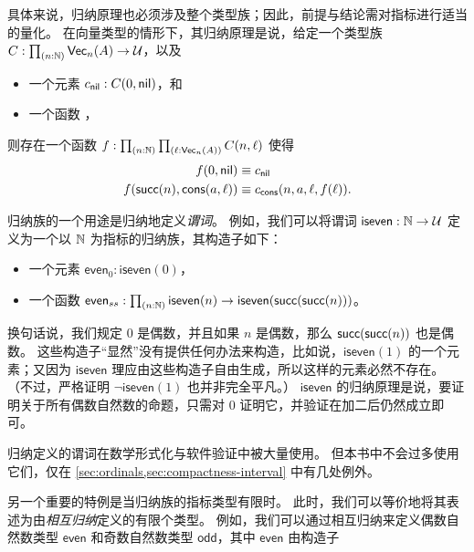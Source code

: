 具体来说，归纳原理也必须涉及整个类型族；因此，前提与结论需对指标进行适当的量化。
在向量类型的情形下，其归纳原理是说，给定一个类型族 $C:\prd{n:\nat} \vect n A \to \type$，以及

\begin{itemize}
\item 一个元素 $c_{\mathsf{nil}} : C(0,\mathsf{nil})$，和
\item 一个函数 ，
\end{itemize}

则存在一个函数 $f:\prd{n:\nat}{\ell:\vect n A} C(n,\ell)$ 使得
\begin{align*}
  f(0,\mathsf{nil}) &\equiv c_{\mathsf{nil}}\\
  f(\mathsf{succ}(n),\mathsf{cons}(a,\ell)) &\equiv c_{\mathsf{cons}}(n,a,\ell,f(\ell)).
\end{align*}

%
%
归纳族的一个用途是归纳地定义\emph{谓词}。
例如，我们可以将谓词 $\mathsf{iseven}:\mathbb{N}\to\mathcal{U}$ 定义为一个以 $\mathbb{N}$ 为指标的归纳族，其构造子如下：

\begin{itemize}
\item 一个元素 $\mathsf{even}_0 : \mathsf{iseven}(0)$，
\item 一个函数 $\mathsf{even}_{ss} : \prd{n:\nat} \mathsf{iseven}(n) \to \mathsf{iseven}(\suc(\suc(n)))$。
\end{itemize}

换句话说，我们规定 $0$ 是偶数，并且如果 $n$ 是偶数，那么 $\mathsf{succ}(\mathsf{succ}(n))$ 也是偶数。
这些构造子``显然''没有提供任何办法来构造，比如说，$\mathsf{iseven}(1)$ 的一个元素；又因为 $\mathsf{iseven}$ 理应由这些构造子自由生成，所以这样的元素必然不存在。
（不过，严格证明 $\neg \mathsf{iseven}(1)$ 也并非完全平凡。）
$\mathsf{iseven}$ 的归纳原理是说，要证明关于所有偶数自然数的命题，只需对 $0$ 证明它，并验证在加二后仍然成立即可。

%
归纳定义的谓词在数学形式化与软件验证中被大量使用。
但本书中不会过多使用它们，仅在 \cref{sec:ordinals,sec:compactness-interval} 中有几处例外。

%
%
另一个重要的特例是当归纳族的指标类型有限时。
此时，我们可以等价地将其表述为由\emph{相互归纳}定义的有限个类型。
例如，我们可以通过相互归纳来定义偶数自然数类型 $\mathsf{even}$ 和奇数自然数类型 $\mathsf{odd}$，其中 $\mathsf{even}$ 由构造子


